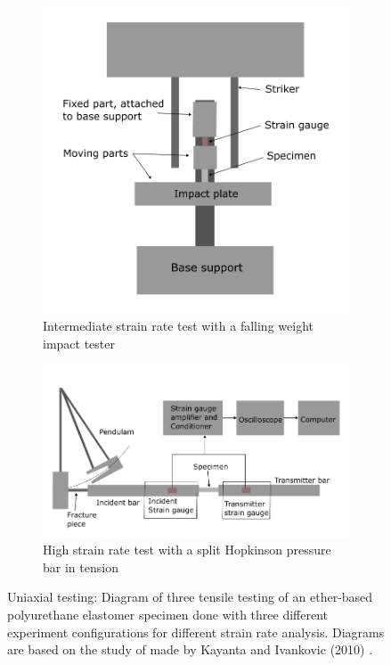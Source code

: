 \begin{figure}
\begin{subfigure}[b]{0.45\textwidth}
        \includegraphics[width=\textwidth]{Images/chapter1/uniaxialintermediate.png}
        \caption{Intermediate strain rate test with a falling weight impact tester}
        \label{fig:subfiginter}
        \end{subfigure}
        \vspace{0.5cm}
        \begin{subfigure}[b]{0.7\textwidth}
        \centering
        \includegraphics[width=\textwidth]{Images/chapter1/uniaxialhigh.png}
        \caption{High strain rate test with a split Hopkinson pressure bar in tension}
        \label{fig:subfighigh}
        \end{subfigure}  
        \hspace{0.3cm}

        \caption{Uniaxial testing: Diagram of three tensile testing of an ether-based polyurethane elastomer specimen done with three different experiment configurations for different strain rate analysis. Diagrams are based on the study of made by Kayanta and Ivankovic (2010) \cite{Kanyanta2010}.}
        \label{fig:uniaxialkan}
\end{figure}

